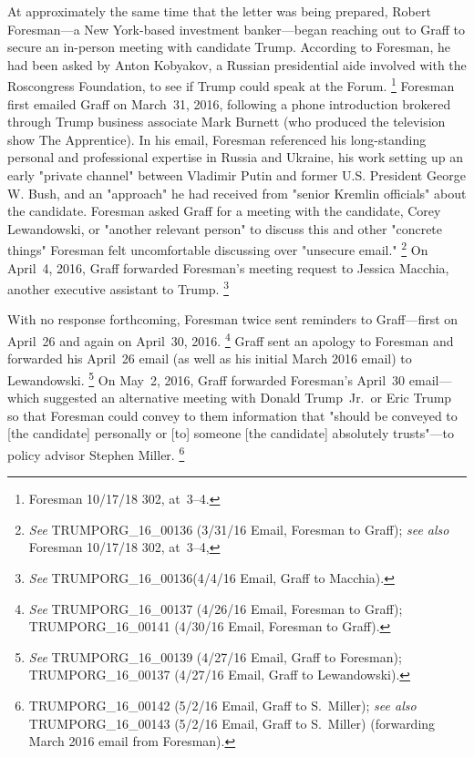 At approximately the same time that the letter was being prepared, Robert Foresman---a New York-based investment banker---began reaching out to Graff to secure an in-person meeting with candidate Trump.
According to Foresman, he had been asked by Anton Kobyakov, a Russian presidential aide involved with the Roscongress Foundation, to see if Trump could speak at the Forum.%
\footnote{Foresman 10/17/18 302, at~3--4.}
Foresman first emailed Graff on March~31, 2016, following a phone introduction brokered through Trump business associate Mark Burnett (who produced the television show The Apprentice).
In his email, Foresman referenced his long-standing personal and professional expertise in Russia and Ukraine, his work setting up an early "private channel" between Vladimir Putin and former U.S. President George W. Bush, and an "approach" he had received from "senior Kremlin officials" about the candidate.
Foresman asked Graff for a meeting with the candidate, Corey Lewandowski, or "another relevant person" to discuss this and other "concrete things" Foresman felt uncomfortable discussing over "unsecure email."%
\footnote{\textit{See} TRUMPORG\_16\_00136 (3/31/16 Email, Foresman to Graff);
\textit{see also} Foresman 10/17/18 302, at~3--4,}
On April~4, 2016, Graff forwarded Foresman's meeting request to Jessica Macchia, another executive assistant to Trump.%
\footnote{\textit{See} TRUMPORG\_16\_00136(4/4/16 Email, Graff to Macchia).}

With no response forthcoming, Foresman twice sent reminders to Graff---first on April~26 and again on April~30, 2016.%
\footnote{\textit{See} TRUMPORG\_16\_00137 (4/26/16 Email, Foresman to Graff);
TRUMPORG\_16\_00141 (4/30/16 Email, Foresman to Graff).}
Graff sent an apology to Foresman and forwarded his April~26 email (as well as his initial March 2016 email) to Lewandowski.%
\footnote{\textit{See} TRUMPORG\_16\_00139 (4/27/16 Email, Graff to Foresman);
TRUMPORG\_16\_00137 (4/27/16 Email, Graff to Lewandowski).}
On May~2, 2016, Graff forwarded Foresman's April~30 email---which suggested an alternative meeting with Donald Trump~Jr.\ or Eric Trump so that Foresman could convey to them information that "should be conveyed to [the candidate] personally or [to] someone [the candidate] absolutely trusts"---to policy advisor Stephen Miller.%
\footnote{TRUMPORG\_16\_00142 (5/2/16 Email, Graff to S.~Miller);
\textit{see also} TRUMPORG\_16\_00143 (5/2/16 Email, Graff to S.~Miller) (forwarding March 2016 email from Foresman).}

